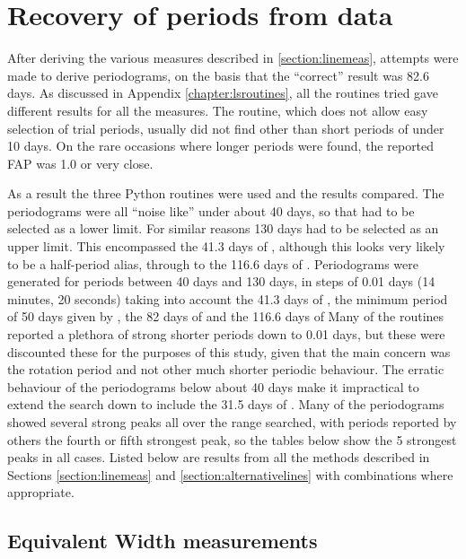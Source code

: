 \section{Recovery of periods from {\harps} data}
\protect\label{section:harpsper}

After deriving the various measures described in \ref{section:linemeas}, attempts were made to derive periodograms, on
the basis that the ``correct'' result was 82.6 days. As discussed in Appendix \ref{chapter:lsroutines}, all the routines
tried gave different results for all the measures. The {\numrecs} routine, which does not allow easy selection of trial
periods, usually did not find other than short periods of under 10 days. On the rare occasions where longer periods were
found, the reported FAP was 1.0 or very close.

As a result the three Python routines were used and the results compared. The periodograms were all ``noise like'' under
about 40 days, so that had to be selected as a lower limit. For similar reasons 130 days had to be selected as an upper
limit. This encompassed the 41.3 days of \citet{benedict93}, although this looks very likely to be a half-period alias,
through to the 116.6 days of \citet[Table 3]{suarezmascareno15}.
Periodograms were generated for periods between 40 days and 130 days, in steps of 0.01 days (14 minutes, 20 seconds)
taking into account the 41.3 days of \citet{benedict93}, the minimum period of 50 days given by \citet{kurster99}, the
82 days of \citealt{benedict92,benedict98,kiraga07} and the 116.6 days of Many of
the routines reported a plethora of strong shorter periods down to 0.01 days, but these were discounted these for the
purposes of this study, given that the main concern was the rotation period and not other much shorter periodic
behaviour. The erratic behaviour of the periodograms below about 40 days make it impractical to extend the search down
to include the 31.5 days of \citet{guinan96}. Many of the periodograms showed several strong peaks all over the range
searched, with periods reported by others the fourth or fifth strongest peak, so the tables below show the 5 strongest
peaks in all cases. Listed below are results from all the methods described in Sections \ref{section:linemeas} and
\ref{section:alternativelines} with combinations where appropriate.

\subsection{Equivalent Width measurements}
\protect\label{section:ewper}


